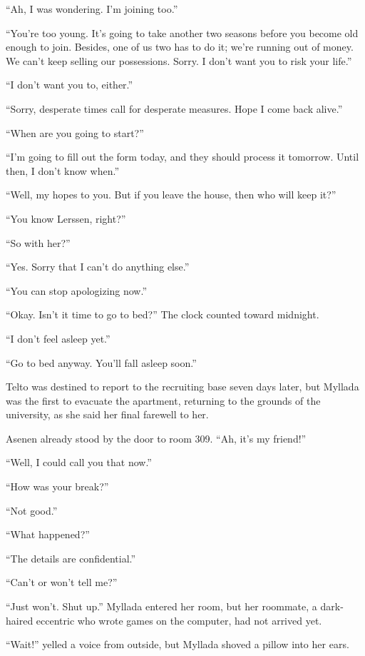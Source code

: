 ``Ah, I was wondering. I'm joining too.''

``You're too young. It's going to take another two seasons before you become old enough to join. Besides, one of us two has to do it; we're running out of money. We can't keep selling our possessions. Sorry. I don't want you to risk your life.''

``I don't want you to, either.''

``Sorry, desperate times call for desperate measures. Hope I come back alive.''

``When are you going to start?''

``I'm going to fill out the form today, and they should process it tomorrow. Until then, I don't know when.''

``Well, my hopes to you. But if you leave the house, then who will keep it?''

``You know Lerssen, right?''

``So with her?''

``Yes. Sorry that I can't do anything else.''

``You can stop apologizing now.''

``Okay. Isn't it time to go to bed?'' The clock counted toward midnight.

``I don't feel asleep yet.''

``Go to bed anyway. You'll fall asleep soon.''

\centeredstars

Telto was destined to report to the recruiting base seven days later, but Myllada was the first to evacuate the apartment, returning to the grounds of the university, as she said her final farewell to her.

Asenen already stood by the door to room 309. ``Ah, it's my friend!''

``Well, I could call you that now.''

``How was your break?''

``Not good.''

``What happened?''

``The details are confidential.''

``Can't or won't tell me?''

``Just won't. Shut up.'' Myllada entered her room, but her roommate, a dark-haired eccentric who wrote games on the computer, had not arrived yet.

``Wait!'' yelled a voice from outside, but Myllada shoved a pillow into her ears.

\centeredstars


